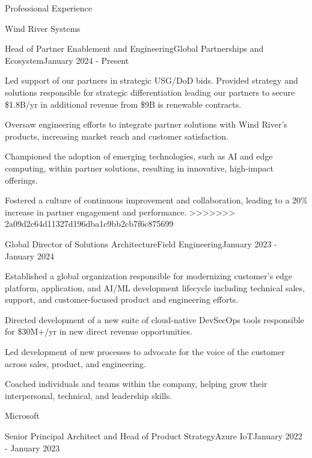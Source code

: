 \documentclass{resume} %
\begin{document}
\begin{rSection}{Professional Experience}
\begin{rCompany}{Wind River Systems}{}{}
\begin{rSubSubsection}{Head of Partner Enablement and Engineering}{Global Partnerships and Ecosystem}{January 2024 - Present}
      \item %
      \item Led support of our partners in strategic USG/DoD bids. Provided strategy and solutions  responsible for strategic differentiation leading our partners to secure \$1.8B/yr in additional revenue from \$9B is renewable contracts.
      \item Oversaw engineering efforts to integrate partner solutions with Wind River's products, increasing market reach and customer satisfaction.
      \item Championed the adoption of emerging technologies, such as AI and edge computing, within partner solutions, resulting in innovative, high-impact offerings.
      \item Fostered a culture of continuous improvement and collaboration, leading to a 20\% increase in partner engagement and performance.
>>>>>>> 2a09d2c64d11327d196dba1c9bb2cb7f6c875699

    \end{rSubSubsection}
    
    \begin{rSubSubsection}{Global Director of Solutions Architecture}{Field Engineering}{January 2023 - January 2024}
      \item Established a global organization responsible for modernizing customer's edge platform, application, and AI/ML development lifecycle including technical sales, support, and customer-focused product and engineering efforts.
      \item Directed development of a new suite of cloud-native DevSecOps tools responsible for \$30M+/yr in new direct revenue opportunities.
      \item Led development of new processes to advocate for the voice of the customer across sales, product, and engineering.
      \item Coached individuals and teams within the company, helping grow their interpersonal, technical, and leadership skills.
    \end{rSubSubsection}
  \end{rCompany}

  \begin{rCompany}{Microsoft}{}{}

    \begin{rSubSubsection}{Senior Principal Architect and Head of Product Strategy}{Azure IoT}{January 2022 - January 2023}


\end{rSubSubsection}
\end{rCompany}
\end{rSection}
\end{document}
